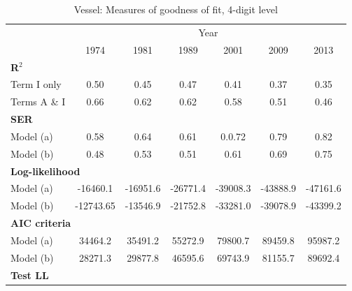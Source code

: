 \documentclass[11pt,twoside, authoryear]{elsarticle}
\begin{document}
\begin{table}[htbp]
  \centering
  \caption{Vessel: Measures of goodness of fit, 4-digit level}
\begin{center}
\label{tab:good_fit_ves_rob}%
  \footnotesize{
\begin{tabular}{l|cccccc}
\hline
\hline
      & \multicolumn{6}{c}{Year}                   \\
      & \multicolumn{1}{c}{1974} & \multicolumn{1}{c}{1981} & \multicolumn{1}{c}{1989} & \multicolumn{1}{c}{2001} & \multicolumn{1}{c}{2009} & \multicolumn{1}{c}{2013}  \\ \hline
\multicolumn{7}{l}{\textbf{R$^{2}$}} \\ \hline
Term I only & 0.50  & 0.45  & \multicolumn{1}{c}{0.47} & \multicolumn{1}{c}{0.41} & \multicolumn{1}{c}{0.37} & \multicolumn{1}{c}{0.35} \\
Terms A \& I & 0.66  & 0.62  & \multicolumn{1}{c}{0.62} & \multicolumn{1}{c}{0.58} & \multicolumn{1}{c}{0.51} & \multicolumn{1}{c}{0.46} \\ \hline
\multicolumn{7}{l}{\textbf{SER} }\\ \hline
Model (a) &    0.58   &   0.64    & \multicolumn{1}{c}{0.61} & \multicolumn{1}{c}{0.0.72} & \multicolumn{1}{c}{0.79} & \multicolumn{1}{c}{0.82} \\
Model (b) &   0.48    &    0.53   & \multicolumn{1}{c}{0.51} & \multicolumn{1}{c}{0.61} & \multicolumn{1}{c}{0.69} & \multicolumn{1}{c}{0.75} \\ \hline
\multicolumn{7}{l}{\textbf{Log-likelihood} } \\ \hline
Model (a)& -16460.1 & -16951.6 & \multicolumn{1}{c}{-26771.4} & \multicolumn{1}{c}{-39008.3} & \multicolumn{1}{c}{-43888.9} & \multicolumn{1}{c}{-47161.6} \\
Model (b) & -12743.65 & -13546.9 & \multicolumn{1}{c}{-21752.8} & \multicolumn{1}{c}{-33281.0} & \multicolumn{1}{c}{-39078.9} & \multicolumn{1}{c}{-43399.2}  \\ \hline
\multicolumn{7}{l}{\textbf{AIC criteria} } \\ \hline
Model (a) & 34464.2 & 35491.2 & \multicolumn{1}{c}{55272.9} & \multicolumn{1}{c}{79800.7} & \multicolumn{1}{c}{89459.8} & \multicolumn{1}{c}{95987.2}\\
Model (b) & 28271.3 & 29877.8 & \multicolumn{1}{c}{46595.6} & \multicolumn{1}{c}{69743.9} & \multicolumn{1}{c}{81155.7} & \multicolumn{1}{c}{89692.4} \\ \hline
\multicolumn{7}{l}{\textbf{Test LL}} \\ \hline

\end{tabular}}
\end{center}
\end{table}
\end{document}
